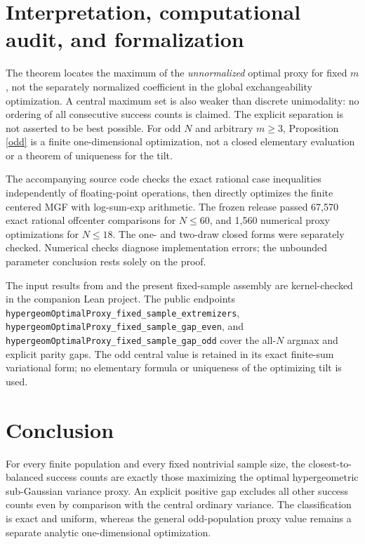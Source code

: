 \documentclass[11pt]{article}
\numberwithin{equation}{section}
\theoremstyle{remark}\newtheorem{remark}[theorem]{Remark}
\begin{document}
\section{Interpretation, computational audit, and formalization}
The theorem locates the maximum of the \emph{unnormalized}
optimal proxy for fixed $m$, not the separately normalized
coefficient in the global exchangeability optimization.
A central maximum set is also weaker than discrete unimodality:
no ordering of all consecutive success counts is claimed.
The explicit separation is not asserted to be best possible.
For odd $N$ and arbitrary $m\ge3$, Proposition \ref{odd}
is a finite one-dimensional optimization, not a closed
elementary evaluation or a theorem of uniqueness for the tilt.

The accompanying source code checks the exact rational
case inequalities independently of floating-point operations,
then directly optimizes the finite centered MGF with
log-sum-exp arithmetic. The frozen release passed 67,570
exact rational offcenter comparisons for $N\le60$, and
1,560 numerical proxy optimizations for $N\le18$.
The one- and two-draw closed forms were separately checked.
Numerical checks diagnose implementation errors; the
unbounded parameter conclusion rests solely on the proof.

The input results from \cite{Wang} and the present fixed-sample assembly
are kernel-checked in the companion Lean project. The public endpoints
\texttt{hypergeomOptimalProxy\_fixed\_sample\_extremizers},
\texttt{hypergeomOptimalProxy\_fixed\_sample\_gap\_even}, and
\texttt{hypergeomOptimalProxy\_fixed\_sample\_gap\_odd} cover the all-$N$ argmax and
explicit parity gaps. The odd central value is retained in its exact
finite-sum variational form; no elementary formula or uniqueness of the
optimizing tilt is used.

\section{Conclusion}
For every finite population and every fixed nontrivial sample size,
the closest-to-balanced success counts are exactly those
maximizing the optimal hypergeometric sub-Gaussian variance proxy.
An explicit positive gap excludes all other success counts
even by comparison with the central ordinary variance.
The classification is exact and uniform, whereas the general
odd-population proxy value remains a separate analytic
one-dimensional optimization.
\end{document}
